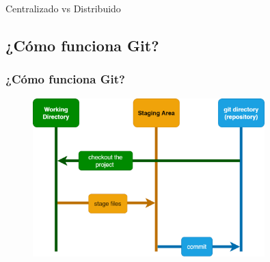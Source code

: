 \documentclass{beamer}
\begin{document}


\begin{frame}{Centralizado vs Distribuido }

  \begin{figure}
    \qquad
  \end{figure}

\end{frame}


\subsection{¿Cómo funciona Git?} 

\begin{frame}
  \frametitle{¿Cómo funciona Git?} 

  \begin{figure}
    \includegraphics[width = 0.8\textwidth]{images/git-states.png}
  \end{figure}
  
\end{frame}
\end{document}
